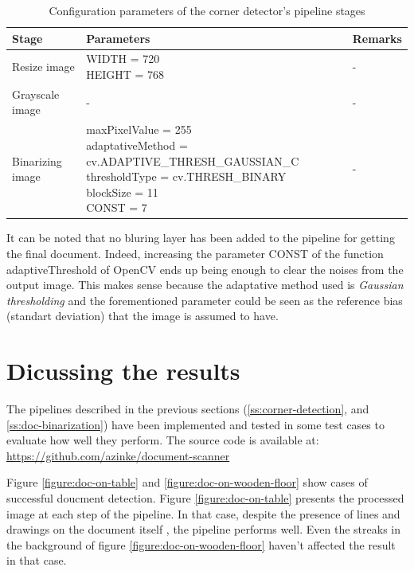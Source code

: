 \documentclass{scrartcl}
\newcommand{\param}[1]{{\ttfamily\footnotesize{#1}}}
\begin{document}
  \begin{table}[htbp]
    \centering
    \caption{Configuration parameters of the corner detector's pipeline stages}
    \begin{tabular}{ | l | l | l |}
      \hline
      \textbf{Stage} & \textbf{Parameters} & \textbf{Remarks} \\
      \hline \hline
        Resize image
        &
        \makecell[l]{
          \param{WIDTH = 720} \\
          \param{HEIGHT = 768}
        }
        &
        -
      \\
      \hline
        Grayscale image
        &
        -
        &
        -
      \\
      \hline
        Binarizing image
        &
        \makecell[l]{
          \param{maxPixelValue = 255} \\
          \param{adaptativeMethod = cv.ADAPTIVE\_THRESH\_GAUSSIAN\_C} \\
          \param{thresholdType = cv.THRESH\_BINARY} \\
          \param{blockSize = 11} \\
          \param{CONST = 7}
        }
        &
        -
      \\
      \hline
    \end{tabular}
    \label{table:corner-detection-pipeline-params}
  \end{table}

  It can be noted that no bluring layer has been added to the pipeline for getting the final
  document. Indeed, increasing the parameter \param{CONST} of the function
  \param{adaptiveThreshold} of OpenCV ends up being enough to clear the noises from the output
  image. This makes sense because the adaptative method used is \textit{Gaussian thresholding}
  and the forementioned parameter could be seen as the reference bias (standart deviation) that
  the image is assumed to have.

  \section{Dicussing the results}

  The pipelines described in the previous sections
  (\ref{ss:corner-detection}, and \ref{ss:doc-binarization}) have been implemented and tested in
  some test cases to evaluate how well they perform. The source code is
  available at: \url{https://github.com/azinke/document-scanner}

  Figure \ref{figure:doc-on-table} and 
  \ref{figure:doc-on-wooden-floor} show cases of successful doucment detection.
  Figure \ref{figure:doc-on-table} presents the processed image at each step of the pipeline.
  In that case, despite the presence of lines and drawings on the document itself ,
  the pipeline performs well. Even the streaks in the background of figure
  \ref{figure:doc-on-wooden-floor} haven't affected the result in that case.
  
\end{document}
